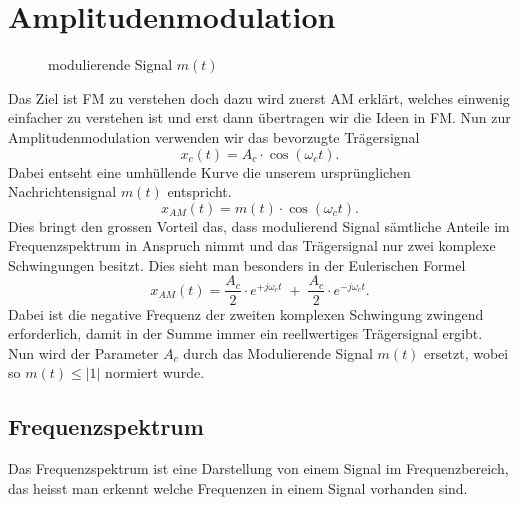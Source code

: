 %
%
%
\section{Amplitudenmodulation\label{fm:section:teil0}}

\begin{figure}
	\centering
	
	\caption{modulierende Signal \(m(t)\)}
	\label{fig:}
\end{figure}

Das Ziel ist FM zu verstehen doch dazu wird zuerst AM erklärt, welches einwenig einfacher zu verstehen ist und erst dann übertragen wir die Ideen in FM.
Nun zur Amplitudenmodulation verwenden wir das bevorzugte Trägersignal
\[
    x_c(t) = A_c \cdot \cos(\omega_ct).
\]
Dabei entseht eine umhüllende Kurve die unserem ursprünglichen Nachrichtensignal \(m(t)\) entspricht.
\[
    x_{AM}(t) = m(t) \cdot \cos(\omega_ct).
\]
Dies bringt den grossen Vorteil das, dass modulierend Signal sämtliche Anteile im Frequenzspektrum in Anspruch nimmt 
und das Trägersignal nur zwei komplexe Schwingungen besitzt. 
Dies sieht man besonders in der Eulerischen Formel
\[
    x_{AM}(t) = \frac{A_c}{2} \cdot e^{+j\omega_ct}\;+\;\frac{A_c}{2} \cdot e^{-j\omega_ct}.
    \label{fm:eq:AM:euler}
\]
Dabei ist die negative Frequenz der zweiten komplexen Schwingung zwingend erforderlich, damit in der Summe immer ein reellwertiges Trägersignal ergibt.
Nun wird der Parameter \(A_c\) durch das  Modulierende Signal \(m(t)\) ersetzt, wobei so \(m(t) \leqslant |1|\) normiert wurde.

\subsection{Frequenzspektrum}
Das Frequenzspektrum ist eine Darstellung von einem Signal im Frequenzbereich, das heisst man erkennt welche Frequenzen in einem Signal vorhanden sind.

